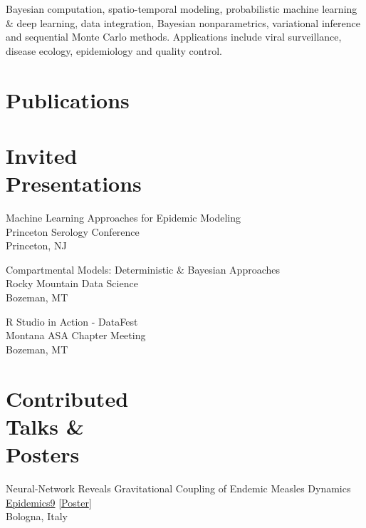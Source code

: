 \documentclass{wm_cv}
\begin{document}
Bayesian computation, spatio-temporal modeling, probabilistic machine learning \& deep learning, data integration, Bayesian nonparametrics, variational inference and sequential Monte Carlo methods. 
Applications include viral surveillance, disease ecology, epidemiology and quality control. 

\section{Publications}%


\section{Invited \\ Presentations}

Machine Learning Approaches for Epidemic Modeling\hfill {} \\
    \indent \quad Princeton Serology Conference  \\
   \indent \quad Princeton, NJ

Compartmental Models: Deterministic \& Bayesian Approaches \hfill {}\\ 
    \indent \quad Rocky Mountain Data Science  \\
   \indent \quad Bozeman, MT
   
R Studio in Action - DataFest \hfill {}\\ 
    \indent \quad Montana ASA Chapter Meeting  \\
   \indent \quad Bozeman, MT

\section{Contributed \\ Talks \& \\ Posters}
Neural-Network Reveals Gravitational Coupling of Endemic Measles Dynamics \hfill {}\\
\indent \quad \href{https://www.elsevier.com/events/conferences/all/international-conference-on-infectious-disease-dynamics}{Epidemics9} [\href{https://www.wyattgmadden.com/files/posters/20231201epidemics/epidemics2023_poster.pdf}{Poster}] \\ 
   \indent \quad Bologna, Italy \\
\end{document}
